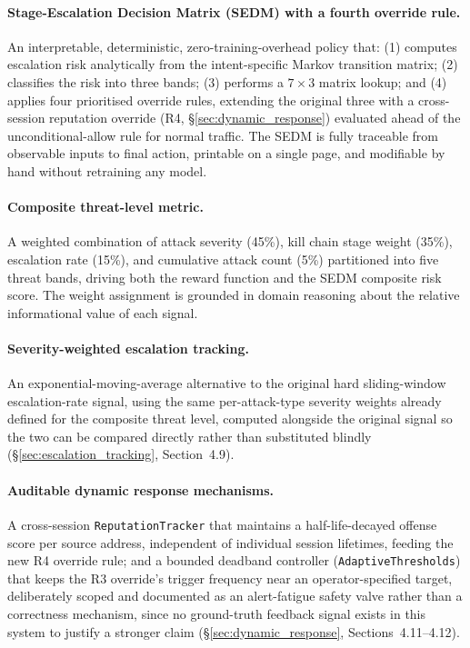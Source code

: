 \paragraph{Stage-Escalation Decision Matrix (SEDM) with a fourth override
rule.}
An interpretable, deterministic, zero-training-overhead policy that:
(1) computes escalation risk analytically from the intent-specific Markov
transition matrix; (2) classifies the risk into three bands;
(3) performs a $7 \times 3$ matrix lookup; and
(4) applies four prioritised override rules, extending the original three
with a cross-session reputation override (R4, \S\ref{sec:dynamic_response})
evaluated ahead of the unconditional-allow rule for normal traffic.
The SEDM is fully traceable from observable inputs to final action,
printable on a single page, and modifiable by hand without retraining
any model.

\paragraph{Composite threat-level metric.}
A weighted combination of attack severity (45\%), kill chain stage weight
(35\%), escalation rate (15\%), and cumulative attack count (5\%) partitioned
into five threat bands, driving both the reward function and the SEDM
composite risk score.
The weight assignment is grounded in domain reasoning about the relative
informational value of each signal.

\paragraph{Severity-weighted escalation tracking.}
An exponential-moving-average alternative to the original hard
sliding-window escalation-rate signal, using the same per-attack-type
severity weights already defined for the composite threat level, computed
alongside the original signal so the two can be compared directly rather
than substituted blindly (\S\ref{sec:escalation_tracking}, Section~4.9).

\paragraph{Auditable dynamic response mechanisms.}
A cross-session \texttt{ReputationTracker} that maintains a
half-life-decayed offense score per source address, independent of
individual session lifetimes, feeding the new R4 override rule; and a
bounded deadband controller (\texttt{AdaptiveThresholds}) that keeps the R3
override's trigger frequency near an operator-specified target,
deliberately scoped and documented as an alert-fatigue safety valve rather
than a correctness mechanism, since no ground-truth feedback signal exists
in this system to justify a stronger claim (\S\ref{sec:dynamic_response},
Sections~4.11--4.12).


